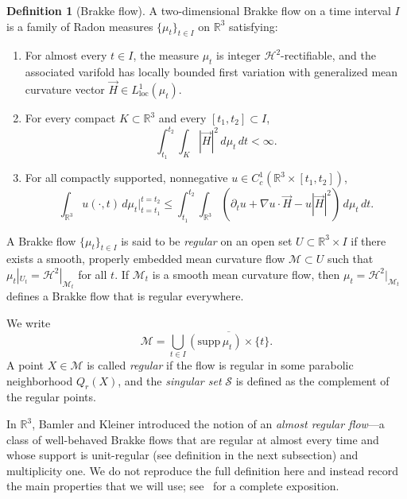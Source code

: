 \documentclass[11pt,reqno]{amsart}
\numberwithin{equation}{section}
\theoremstyle{definition}
\newtheorem{definition}[equation]{Definition}
\theoremstyle{remark}
\theoremstyle{remark}
\theoremstyle{remark}
\theoremstyle{remark}\newtheorem{conjecture}[equation]{Conjecture}
\theoremstyle{remark}\newtheorem{question}[equation]{Question}
\begin{document}
\begin{definition}[Brakke flow]
A two-dimensional Brakke flow on a time interval $I$ is a family of Radon measures $\{ \mu_t \}_{t \in I}$ on $\mathbb{R}^3$ satisfying:
\begin{enumerate}
    \item For almost every $t \in I$, the measure $\mu_t$ is integer $\mathcal{H}^2$-rectifiable, and the associated varifold has locally bounded first variation with generalized mean curvature vector $\vec{H} \in L^1_{\mathrm{loc}}(\mu_t)$.
    \item For every compact $K \subset \mathbb{R}^3$ and every $[t_1,t_2] \subset I$,
    \[
    \int_{t_1}^{t_2} \! \int_K |\vec{H}|^2 \, d\mu_t\, dt < \infty.
    \]
    \item For all compactly supported, nonnegative $u \in C_c^1(\mathbb{R}^3 \times [t_1,t_2])$,
    \[
    \int_{\mathbb{R}^3} u(\cdot,t)\, d\mu_t \Big|_{t=t_1}^{t=t_2}
    \le \int_{t_1}^{t_2} \! \int_{\mathbb{R}^3}
        (\partial_t u + \nabla u \cdot \vec{H} - u |\vec{H}|^2)
        \, d\mu_t\, dt.
    \]
\end{enumerate}
\end{definition}

A Brakke flow $\{ \mu_t \}_{t \in I}$ is said to be \emph{regular} on an open set $U \subset \mathbb{R}^3 \times I$ if there exists a smooth, properly embedded mean curvature flow $\mathcal{M} \subset U$ such that $\mu_t|_{U_t} = \mathcal{H}^2|_{\mathcal{M}_t}$ for all $t$.  
If $\mathcal{M}_t$ is a smooth mean curvature flow, then $\mu_t = \mathcal{H}^2|_{\mathcal{M}_t}$ defines a Brakke flow that is regular everywhere.

We write
\[
\mathcal{M} = \bigcup_{t \in I} \overline{ (\mathrm{supp}\,\mu_t) \times \{t\} }.
\]
A point $X \in \mathcal{M}$ is called \emph{regular} if the flow is regular in some parabolic neighborhood $Q_r(X)$, and the \emph{singular set} $\mathcal{S}$ is defined as the complement of the regular points. 



\medskip

In $\mathbb{R}^3$, Bamler and Kleiner introduced the notion of an \emph{almost regular flow}—a class of well-behaved Brakke flows that are regular at almost every time and whose support is unit-regular (see definition in the next subsection) and multiplicity one.  
We do not reproduce the full definition here and instead record the main properties that we will use; see~\cite{BK23} for a complete exposition.
\end{document}
